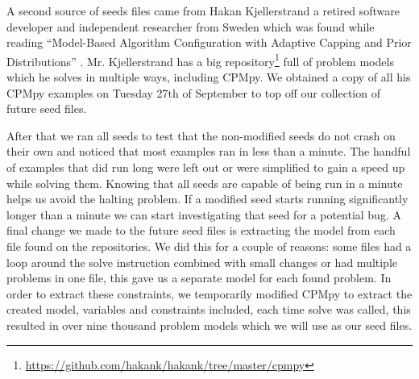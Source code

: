 A second source of seeds files came from Hakan Kjellerstrand a retired software developer and independent researcher from Sweden which was found while reading “Model-Based Algorithm Configuration with Adaptive Capping and Prior Distributions” \cite{18bleukx2022model}. Mr. Kjellerstrand has a big repository\footnote{\url{https://github.com/hakank/hakank/tree/master/cpmpy}} full of problem models which he solves in multiple ways, including CPMpy. We obtained a copy of all his CPMpy examples on Tuesday 27th of September to top off our collection of future seed files.


After that we ran all seeds to test that the non-modified seeds do not crash on their own and noticed that most examples ran in less than a minute. The handful of examples that did run long were left out or were simplified to gain a speed up while solving them. Knowing that all seeds are capable of being run in a minute helps us avoid the halting problem. If a modified seed starts running significantly longer than a minute we can start investigating that seed for a potential bug. A final change we made to the future seed files is extracting the model from each file found on the repositories. We did this for a couple of reasons: some files had a loop around the solve instruction combined with small changes or had multiple problems in one file, this gave us a separate model for each found problem. In order to extract these constraints, we temporarily modified CPMpy to extract the created model, variables and constraints included, each time solve was called, this resulted in over nine thousand problem models which we will use as our seed files.




